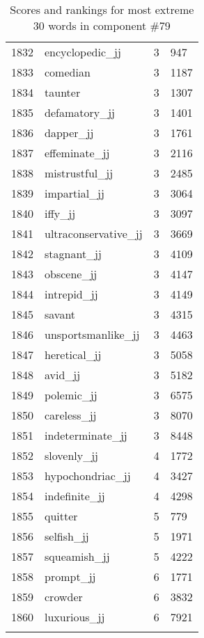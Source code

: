 \begin{longtable}[!htbp]{| rlr@{.}l |}
    1832 & encyclopedic\_jj & 3 & 947 \\
    1833 & comedian & 3 & 1187 \\
    1834 & taunter & 3 & 1307 \\
    1835 & defamatory\_jj & 3 & 1401 \\
    1836 & dapper\_jj & 3 & 1761 \\
    1837 & effeminate\_jj & 3 & 2116 \\
    1838 & mistrustful\_jj & 3 & 2485 \\
    1839 & impartial\_jj & 3 & 3064 \\
    1840 & iffy\_jj & 3 & 3097 \\
    1841 & ultraconservative\_jj & 3 & 3669 \\
    1842 & stagnant\_jj & 3 & 4109 \\
    1843 & obscene\_jj & 3 & 4147 \\
    1844 & intrepid\_jj & 3 & 4149 \\
    1845 & savant & 3 & 4315 \\
    1846 & unsportsmanlike\_jj & 3 & 4463 \\
    1847 & heretical\_jj & 3 & 5058 \\
    1848 & avid\_jj & 3 & 5182 \\
    1849 & polemic\_jj & 3 & 6575 \\
    1850 & careless\_jj & 3 & 8070 \\
    1851 & indeterminate\_jj & 3 & 8448 \\
    1852 & slovenly\_jj & 4 & 1772 \\
    1853 & hypochondriac\_jj & 4 & 3427 \\
    1854 & indefinite\_jj & 4 & 4298 \\
    1855 & quitter & 5 & 779 \\
    1856 & selfish\_jj & 5 & 1971 \\
    1857 & squeamish\_jj & 5 & 4222 \\
    1858 & prompt\_jj & 6 & 1771 \\
    1859 & crowder & 6 & 3832 \\
    1860 & luxurious\_jj & 6 & 7921 \\
    \hline
    \caption{Scores and rankings for most extreme 30 words in component \#79} \\
\end{longtable}
